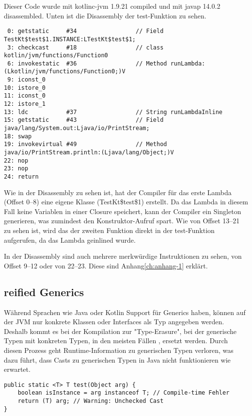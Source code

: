 Dieser Code wurde mit kotlinc-jvm 1.9.21 compiled und mit javap 14.0.2 disassembled.
Unten ist die Disassembly der test-Funktion zu sehen.

\begin{verbatim}
 0: getstatic     #34                 // Field TestKt$test$1.INSTANCE:LTestKt$test$1;
 3: checkcast     #18                 // class kotlin/jvm/functions/Function0
 6: invokestatic  #36                 // Method runLambda:(Lkotlin/jvm/functions/Function0;)V
 9: iconst_0
10: istore_0
11: iconst_0
12: istore_1
13: ldc           #37                 // String runLambdaInline
15: getstatic     #43                 // Field java/lang/System.out:Ljava/io/PrintStream;
18: swap
19: invokevirtual #49                 // Method java/io/PrintStream.println:(Ljava/lang/Object;)V
22: nop
23: nop
24: return
\end{verbatim}

Wie in der Disassembly zu sehen ist, hat der Compiler für das erste Lambda (Offset 0--8) eine eigene Klasse
(TestKt\$test\$1) erstellt.
Da das Lambda in diesem Fall keine Variablen in einer Closure speichert, kann der Compiler ein Singleton generieren,
was zumindest den Konstruktor-Aufruf spart.
Wie von Offset 13--21 zu sehen ist, wird das  der zweiten Funktion direkt in der test-Funktion
aufgerufen, da das Lambda geinlined wurde.

\begin{infoBox}
In der Disassembly sind auch mehrere merkwürdige Instruktionen zu sehen, \zB von Offset 9--12 oder von 22--23.
Diese sind Anhang\ref{ch:anhang-1} erklärt.
\end{infoBox}

\subsection{reified Generics}

Während Sprachen wie Java oder Kotlin Support für Generics haben, können auf der JVM nur konkrete Klassen oder
Interfaces als Typ angegeben werden.
Deshalb kommt es bei der Kompilation zur "Type-Erasure", bei der generische Typen mit konkreten Typen, in den meisten
Fällen , ersetzt werden.
Durch diesen Prozess geht Runtime-Information zu generischen Typen verloren, was \zB dazu führt, dass Casts zu
generischen Typen in Java nicht funktionieren wie erwartet.\cite{jdocTypeErasure}

\begin{verbatim}
public static <T> T test(Object arg) {
    boolean isInstance = arg instanceof T; // Compile-time Fehler
    return (T) arg; // Warning: Unchecked Cast
}
\end{verbatim}

